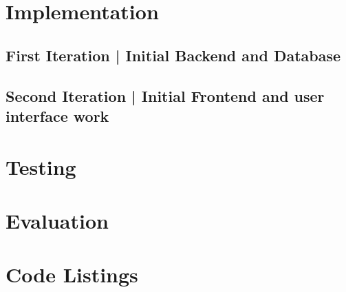 \documentclass[11pt,a4paper]{report}
\begin{document}
\pagebreak

\chapter{Implementation}

\section{First Iteration | Initial Backend and Database}


\pagebreak
\section{Second Iteration | Initial Frontend and user interface work}


\pagebreak

\chapter{Testing}

\chapter{Evaluation}

\chapter{Code Listings}
\end{document}
